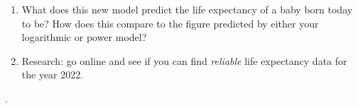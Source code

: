 \begin{minipage}[t]{0.83\textwidth}
\begin{enumerate}
\item 
    What does this new model predict
            the life expectancy of a baby born today to be?
            How does this compare to the figure predicted
            by either your logarithmic or power model?

        \item
            Research: go online and see if you can find 
            \emph{reliable} life expectancy data for the year 2022.

    \end{enumerate}

\end{minipage}
.
\hspace{1em}
